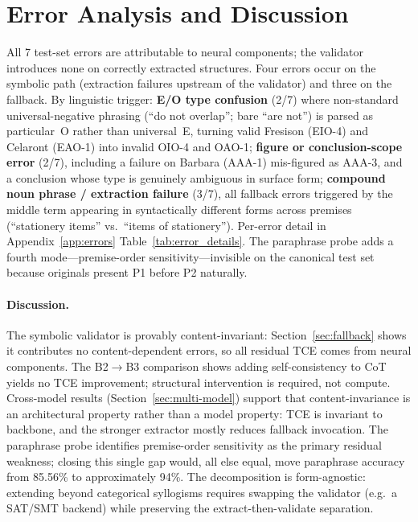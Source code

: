 \documentclass[11pt]{article}
\begin{document}
\section{Error Analysis and Discussion}
\label{sec:error-analysis}

All 7 test-set errors are attributable to neural components; the validator introduces none on correctly extracted structures. Four errors occur on the symbolic path (extraction failures upstream of the validator) and three on the fallback. By linguistic trigger: \textbf{E/O type confusion} (2/7) where non-standard universal-negative phrasing (``do not overlap''; bare ``are not'') is parsed as particular~O rather than universal~E, turning valid Fresison (EIO-4) and Celaront (EAO-1) into invalid OIO-4 and OAO-1; \textbf{figure or conclusion-scope error} (2/7), including a failure on Barbara (AAA-1) mis-figured as AAA-3, and a conclusion whose type is genuinely ambiguous in surface form; \textbf{compound noun phrase / extraction failure} (3/7), all fallback errors triggered by the middle term appearing in syntactically different forms across premises (``stationery items'' vs.\ ``items of stationery''). Per-error detail in Appendix~\ref{app:errors} Table~\ref{tab:error_details}. The paraphrase probe adds a fourth mode---premise-order sensitivity---invisible on the canonical test set because originals present P1 before P2 naturally.

\paragraph{Discussion.} The symbolic validator is provably content-invariant: Section~\ref{sec:fallback} shows it contributes no content-dependent errors, so all residual TCE comes from neural components. The B2$\to$B3 comparison shows adding self-consistency to CoT yields no TCE improvement; structural intervention is required, not compute. Cross-model results (Section~\ref{sec:multi-model}) support that content-invariance is an architectural property rather than a model property: TCE is invariant to backbone, and the stronger extractor mostly reduces fallback invocation. The paraphrase probe identifies premise-order sensitivity as the primary residual weakness; closing this single gap would, all else equal, move paraphrase accuracy from 85.56\% to approximately 94\%. The decomposition is form-agnostic: extending beyond categorical syllogisms requires swapping the validator (e.g.\ a SAT/SMT backend) while preserving the extract-then-validate separation.
\end{document}

